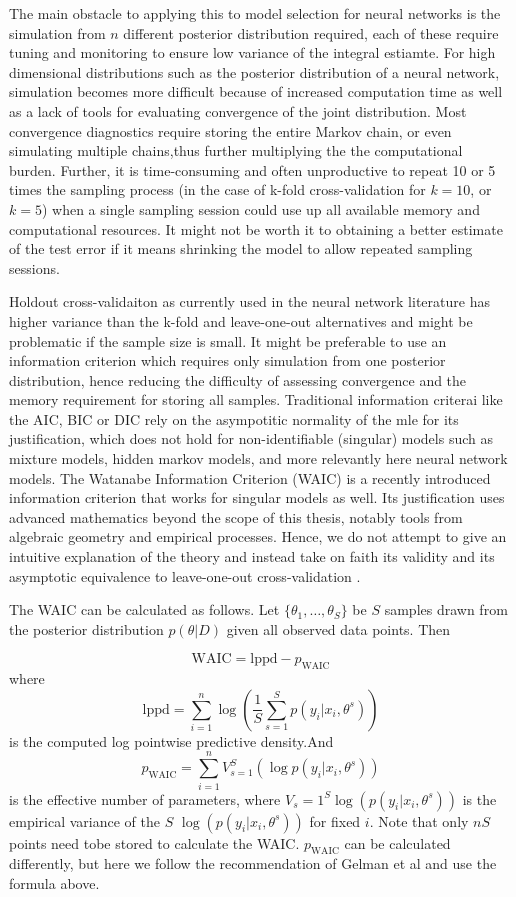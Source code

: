 \documentclass[]{report}
\begin{document}
The main obstacle to applying this to model selection for neural networks is the
simulation from $n$ different posterior distribution required, each of these
require tuning and monitoring to ensure low variance of the integral estiamte.
For high dimensional distributions such as the posterior distribution of a neural
network, simulation becomes more difficult because of increased computation time as
well as a lack of tools for evaluating convergence of the joint distribution.
Most convergence diagnostics require storing the entire Markov chain, or even
simulating multiple chains,thus further multiplying the the computational burden. Further, it is time-consuming and often unproductive to repeat 10 or 5 times the sampling process  
(in the case of k-fold cross-validation for $k=10$, or $k=5$) when a single sampling session could use up all available memory and computational resources. 
It might not be worth it to obtaining a better estimate of the test error if it means shrinking the model to allow repeated sampling sessions.

Holdout cross-validaiton as currently used in the neural network literature
has higher variance than the k-fold and leave-one-out alternatives and might be
problematic if the sample size is small. It might be
preferable to use an information criterion which requires only simulation from
one posterior distribution, hence reducing the difficulty of assessing convergence and the memory requirement for storing all samples. Traditional information criterai like the
AIC, BIC or DIC rely on the asympotitic normality of the mle for its
justification, which does not hold for non-identifiable (singular) models such
as mixture models, hidden markov models, and more relevantly here neural network
models. The Watanabe Information Criterion (WAIC) is a recently introduced information criterion that works for
singular models as well. Its justification uses advanced mathematics beyond the
scope of this thesis, notably tools from algebraic geometry and empirical
processes. Hence, we do not attempt to give an intuitive explanation of the
theory and instead take on faith its validity and its asymptotic equivalence to
leave-one-out cross-validation \cite{watanabe2010asymptotic}.

The WAIC can be calculated as follows. Let $\{\theta_1, \dots, \theta_S\}$ be $S$ samples drawn from the posterior distribution $p(\theta|D)$ given all observed data points. Then 

\[\text{WAIC} = \text{lppd} - p_{\text{WAIC}} \]
where 
\[\text{lppd} = \sum_{i=1}^n \log( \frac{1}{S} \sum_{s=1}^S p(y_i|x_i,\theta^s) ) \]
is the computed log pointwise predictive density.And 
\[p_{\text{WAIC}} = \sum_{i=1}^n V_{s=1}^S(\log p(y_i|x_i, \theta^s)) \]
is the effective number of parameters, where $V_s=1^S \log(p(y_i|x_i,\theta^s))$ is the empirical variance of the $S$  $\log(p(y_i|x_i,\theta^s))$ for fixed $i$. Note that only $nS$ points need tobe stored to calculate the WAIC. $p_{\text{WAIC}}$ can be calculated differently, but here we follow the recommendation of Gelman et al and use the formula above.
\end{document}
